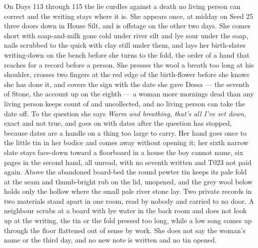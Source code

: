 \documentclass{design/chronicle}
\begin{document}
{On Days 113 through 115 the lie curdles against a death no living person can correct and the writing stays where it is. She appears once, at midday on Seed 25 three doors down in House Silt, and is offstage on the other two days. She comes short with soap-and-milk gone cold under river silt and lye sour under the soap, nails scrubbed to the quick with clay still under them, and lays her birth-slates writing-down on the bench before she turns to the fold, the order of a hand that reaches for a record before a person. She presses the wool a breath too long at his shoulder, crosses two fingers at the red edge of the birth-flower before she knows she has done it, and covers the sign with the date she gave Dessa — the seventh of Stone, the account up on the eighth — a woman more mornings dead than any living person keeps count of and uncollected, and no living person can take the date off. To the question she says \emph{Warm and breathing, that’s all I’ve set down}, exact and not true, and goes on with dates after the question has stopped, because dates are a handle on a thing too large to carry. Her hand goes once to the little tin in her bodice and comes away without opening it; her sixth narrow slate stays face-down toward a floorboard in a house the boy cannot name, six pages in the second hand, all unread, with no seventh written and T023 not paid again. Above the abandoned board-bed the round pewter tin keeps its pale fold at the seam and thumb-bright rub on the lid, unopened, and the grey wool below holds only the hollow where the small pale river stone lay. Two private records in two materials stand apart in one room, read by nobody and carried to no door. A neighbour scrubs at a board with lye water in the back room and does not look up at the writing, the tin or the fold pressed too long, while a low song comes up through the floor flattened out of sense by work. She does not say the woman’s name or the third day, and no new note is written and no tin opened.

}
\end{document}
